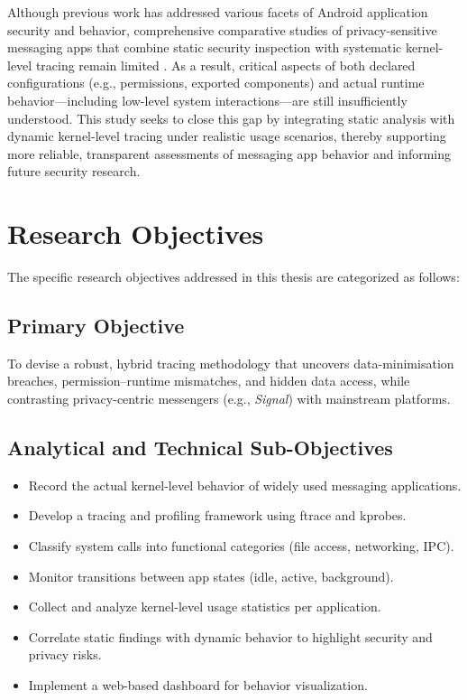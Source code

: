 \documentclass[a4paper,12pt]{report}
\begin{document}
Although previous work has addressed various facets of Android application security and behavior, comprehensive comparative studies of privacy-sensitive messaging apps that combine static security inspection with systematic kernel-level tracing remain limited \cite{DynamicSecurityAnalysis2023}. As a result, critical aspects of both declared configurations (e.g., permissions, exported components) and actual runtime behavior—including low-level system interactions—are still insufficiently understood. This study seeks to close this gap by integrating static analysis with dynamic kernel-level tracing under realistic usage scenarios, thereby supporting more reliable, transparent assessments of messaging app behavior and informing future security research.
\section{Research Objectives}

The specific research objectives addressed in this thesis are categorized as follows:

\subsection*{Primary Objective}

To devise a robust, hybrid tracing methodology that uncovers data-minimisation breaches, permission–runtime mismatches, and hidden data access, while contrasting privacy-centric messengers (e.g., \textit{Signal}) with mainstream platforms.

\subsection*{Analytical and Technical Sub-Objectives}
\begin{itemize}
\item Record the actual kernel-level behavior of widely used messaging applications.
\item Develop a tracing and profiling framework using ftrace and kprobes.
\item Classify system calls into functional categories (file access, networking, IPC).
\item Monitor transitions between app states (idle, active, background).
\item Collect and analyze kernel-level usage statistics per application.
\item Correlate static findings with dynamic behavior to highlight security and privacy risks.
\item Implement a web-based dashboard for behavior visualization.
\end{itemize}
\end{document}

